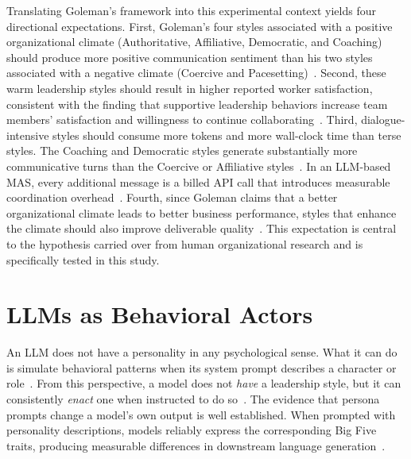 Translating Goleman's framework into this experimental context yields four directional expectations.
First, Goleman's four styles associated with a positive organizational climate (Authoritative, Affiliative, Democratic, and Coaching) should produce more positive communication sentiment than his two styles associated with a negative climate (Coercive and Pacesetting)~\cite{goleman2000leadership}.
Second, these warm leadership styles should result in higher reported worker satisfaction, consistent with the finding that supportive leadership behaviors increase team members' satisfaction and willingness to continue collaborating~\cite{wageman2005teamdiagnosticsurvey, world6020063}.
Third, dialogue-intensive styles should consume more tokens and more wall-clock time than terse styles.
The Coaching and Democratic styles generate substantially more communicative turns than the Coercive or Affiliative styles~\cite{goleman2000leadership}.
In an \ac{LLM}-based \ac{MAS}, every additional message is a billed \ac{API} call that introduces measurable coordination overhead~\cite{zhang2024cutcrapeconomicalcommunication, wang2025agentdropoutdynamicagentelimination}.
Fourth, since Goleman claims that a better organizational climate leads to better business performance, styles that enhance the climate should also improve deliverable quality~\cite{goleman2000leadership}.
This expectation is central to the hypothesis carried over from human organizational research and is specifically tested in this study.

\section{LLMs as Behavioral Actors}
\label{sec:llms-behavioral-actors}

An \ac{LLM} does not have a personality in any psychological sense.
What it can do is simulate behavioral patterns when its system prompt describes a character or role~\cite{shanahan2023roleplaylargelanguagemodels}.
From this perspective, a model does not \textit{have} a leadership style, but it can consistently \textit{enact} one when instructed to do so~\cite{jiang2024personallminvestigatingabilitylarge, serapiogarcia2025personalitytraitslargelanguage}.
The evidence that persona prompts change a model's own output is well established.
When prompted with personality descriptions, models reliably express the corresponding Big Five traits, producing measurable differences in downstream language generation~\cite{serapiogarcia2025personalitytraitslargelanguage}.

